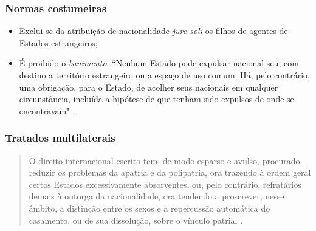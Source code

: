 \documentclass{article}
\begin{document}
\subsubsection{Normas costumeiras}

\begin{itemize}
    \item Exclui-se da atribuição de nacionalidade \textit{jure soli} os filhos de agentes de Estados estrangeiros;
    \item É proibido o \textit{banimento}: ``Nenhum Estado pode expulsar nacional seu, com destino a território estrangeiro ou a espaço de uso comum. Há, pelo contrário, uma obrigação, para o Estado, de acolher seus nacionais em qualquer circunstância, incluída a hipótese de que tenham sido expulsos de onde se encontravam" \cite[p.~80]{rezek_direito_2024}.
\end{itemize}

\subsubsection{Tratados multilaterais}

\begin{quote}
    O direito internacional escrito tem, de modo esparso e avulso, procurado reduzir os problemas da apatria e da polipatria, ora trazendo à ordem geral certos Estados excessivamente absorventes, ou, pelo contrário, refratários demais à outorga da nacionalidade, ora tendendo a proscrever, nesse âmbito, a distinção entre os sexos e a repercussão automática do casamento, ou de sua dissolução, sobre o vínculo patrial \cite[p.~80]{rezek_direito_2024}.
\end{quote}
\end{document}
